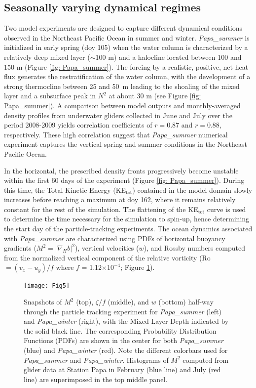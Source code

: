 \documentclass[article,linenumbers]{agujournal2019}
\begin{document}
	\subsection{Seasonally varying dynamical regimes}

	Two model experiments are designed to capture different dynamical conditions observed in the Northeast Pacific Ocean in summer and winter. \textit{Papa\_summer} is initialized in early spring (doy 105) when the water column is characterized by a relatively deep mixed layer ($\sim$100 m) and a halocline located between 100 and 150 m (Figure \ref{fig: Papa_summer}). The forcing by a realistic, positive, net heat flux generates the restratification of the water column, with the development of a strong thermocline between 25 and 50~m leading to the shoaling of the mixed layer and a subsurface peak in $N^2$ at about 30 m (see Figure \ref{fig: Papa_summer}). A comparison between model outputs and monthly-averaged density profiles from underwater gliders collected in June and July over the period 2008-2009 yields correlation coefficients of $r = 0.87$ and $r = 0.88$, respectively. These high correlation suggest that \textit{Papa\_summer} numerical experiment captures the vertical spring and summer conditions in the Northeast Pacific Ocean.

	In the horizontal, the prescribed density fronts progressively become unstable within the first 60 days of the experiment (Figure \ref{fig: Papa_summer}). During this time, the Total Kinetic Energy (KE$_{\text{tot}}$) contained in the model domain slowly increases before reaching a maximum at doy 162, where it remains relatively constant for the rest of the simulation. The flattening of the KE$_{\text{tot}}$ curve is used to determine the time necessary for the simulation to spin-up, hence determining the start day of the particle-tracking experiments. The ocean dynamics associated with \textit{Papa\_summer} are characterized using PDFs of horizontal buoyancy gradients ($M^2 = |\nabla_Hb|^2$), vertical velocities ($w$), and Rossby numbers computed from the normalized vertical component of the relative vorticity (Ro $=(v_x - u_y)/f$ where $f$ = 1.12$\times10^{-4}$; Figure \ref{fig: dynamics}).

	\begin{figure}[t]
		\centering
		\texttt{[image: Fig5]}
		\caption{Snapshots of $M^2$ (top), $\zeta /f$ (middle), and $w$ (bottom) half-way through the particle tracking experiment for \textit{Papa\_summer} (left) and \textit{Papa\_winter} (right), with the Mixed Layer Depth indicated by the solid black line. The corresponding Probability Distribution Functions (PDFs) are shown in the center for both \textit{Papa\_summer} (blue) and \textit{Papa\_winter} (red). Note the different colorbars used for \textit{Papa\_summer} and \textit{Papa\_winter}. Histograms of $M^2$ computed from glider data at Station Papa in February (blue line) and July (red line) are superimposed in the top middle panel.}
		\label{fig: dynamics}
	\end{figure}
\end{document}
